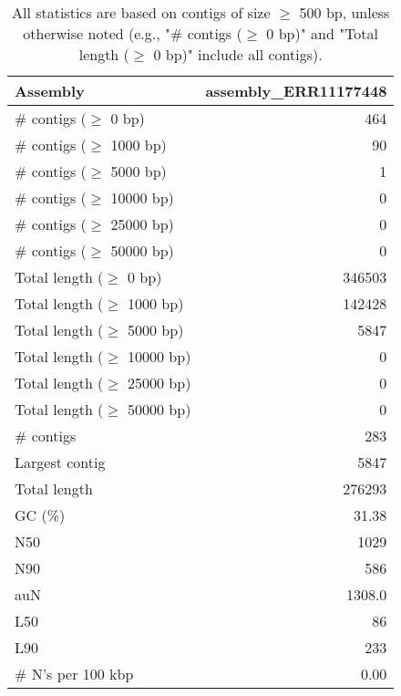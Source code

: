 \documentclass[12pt,a4paper]{article}
\begin{document}
\begin{table}[ht]
\begin{center}
\caption{All statistics are based on contigs of size $\geq$ 500 bp, unless otherwise noted (e.g., "\# contigs ($\geq$ 0 bp)" and "Total length ($\geq$ 0 bp)" include all contigs).}
\begin{tabular}{|l*{1}{|r}|}
\hline
Assembly & assembly\_ERR11177448 \\ \hline
\# contigs ($\geq$ 0 bp) & 464 \\ \hline
\# contigs ($\geq$ 1000 bp) & 90 \\ \hline
\# contigs ($\geq$ 5000 bp) & 1 \\ \hline
\# contigs ($\geq$ 10000 bp) & 0 \\ \hline
\# contigs ($\geq$ 25000 bp) & 0 \\ \hline
\# contigs ($\geq$ 50000 bp) & 0 \\ \hline
Total length ($\geq$ 0 bp) & 346503 \\ \hline
Total length ($\geq$ 1000 bp) & 142428 \\ \hline
Total length ($\geq$ 5000 bp) & 5847 \\ \hline
Total length ($\geq$ 10000 bp) & 0 \\ \hline
Total length ($\geq$ 25000 bp) & 0 \\ \hline
Total length ($\geq$ 50000 bp) & 0 \\ \hline
\# contigs & 283 \\ \hline
Largest contig & 5847 \\ \hline
Total length & 276293 \\ \hline
GC (\%) & 31.38 \\ \hline
N50 & 1029 \\ \hline
N90 & 586 \\ \hline
auN & 1308.0 \\ \hline
L50 & 86 \\ \hline
L90 & 233 \\ \hline
\# N's per 100 kbp & 0.00 \\ \hline
\end{tabular}
\end{center}
\end{table}
\end{document}
